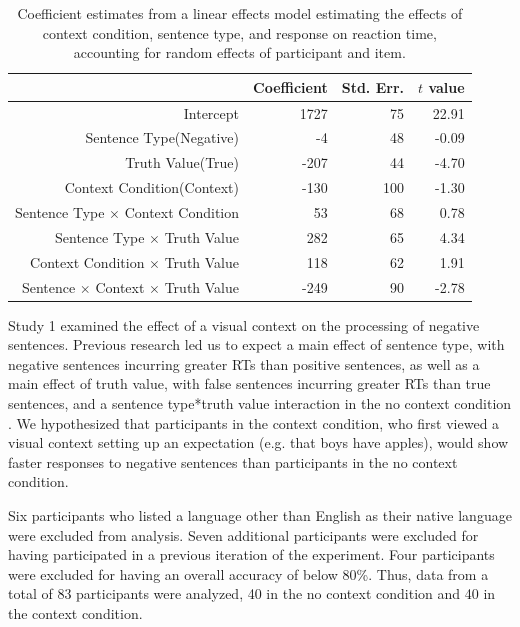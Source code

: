 \documentclass[10pt,letterpaper]{article}
\begin{document}
\begin{table}[t]
\caption{\label{tab:e1model} Coefficient estimates from a linear effects model estimating the effects of context condition, sentence type, and response on reaction time, accounting for random effects of participant and item.}
\begin{center}
\small\addtolength{\tabcolsep}{-5pt}
\begin{tabular}{ r  r  r  r  } 
\hline
 & Coefficient & Std. Err. &  $t$ value \\ \hline 
  Intercept & 1727 & 75 & 22.91 \\ 	            
Sentence Type(Negative) & -4 & 48 & -0.09\\
Truth Value(True) &  -207 & 44 & -4.70\\
Context Condition(Context) & -130 & 100 & -1.30\\
Sentence Type $\times$ Context Condition & 53 & 68 & 0.78\\
Sentence Type $\times$ Truth Value & 282 & 65 & 4.34\\
Context Condition $\times$ Truth Value &  118 & 62 & 1.91\\
Sentence $\times$ Context $\times$ Truth Value & -249 & 90 & -2.78\\
\hline
\end{tabular}
\end{center} 
\end{table}

Study 1 examined the effect of a visual context on the processing of negative sentences.  Previous research led us to expect a main effect of sentence type, with negative sentences incurring greater RTs than positive sentences, as well as a main effect of truth value, with false sentences incurring greater RTs than true sentences, and a sentence type*truth value interaction in the no context condition \cite{hclark1972}.  We hypothesized that participants in the context condition, who first viewed a visual context setting up an expectation (e.g. that boys have apples), would show faster responses to negative sentences than participants in the no context condition.  

Six participants who listed a language other than English as their native language were excluded from analysis.  Seven additional participants were excluded for having participated in a previous iteration of the experiment.  Four participants were excluded for having an overall accuracy of below 80\%.  Thus, data from a total of 83 participants were analyzed, 40 in the no context condition and 40 in the context condition.  
\end{document}
